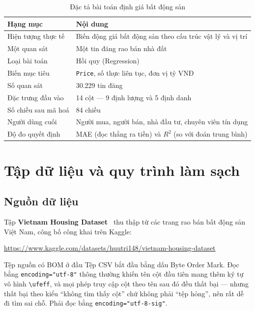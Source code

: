 \begin{table}[H]
\centering
\caption{Đặc tả bài toán định giá bất động sản}
\label{tab:dacta-hou}
\small
\begin{tabularx}{\textwidth}{@{}L{4.2cm}X@{}}
\toprule
\textbf{Hạng mục} & \textbf{Nội dung} \\
\midrule
Hiện tượng thực tế   & Biến động giá bất động sản theo cấu trúc vật lý và vị trí \\
Một quan sát         & Một tin đăng rao bán nhà đất \\
Loại bài toán        & Hồi quy (Regression) \\
Biến mục tiêu        & \texttt{Price}, số thực liên tục, đơn vị tỷ VNĐ \\
Số quan sát          & 30.229 tin đăng \\
Đặc trưng đầu vào    & 14 cột --- 9 định lượng và 5 định danh \\
Số chiều sau mã hoá  & 84 chiều \\
Người dùng cuối      & Người mua, người bán, nhà đầu tư, chuyên viên tín dụng \\
Độ đo quyết định     & MAE (đọc thẳng ra tiền) và $R^2$ (so với đoán trung bình) \\
\bottomrule
\end{tabularx}
\end{table}

\section{Tập dữ liệu và quy trình làm sạch}
\label{sec:dulieu-hou}

\subsection{Nguồn dữ liệu}

Tập \textbf{Vietnam Housing Dataset}~\cite{vnhousing} thu thập từ các trang rao bán bất động sản
Việt Nam, công bố công khai trên Kaggle:

\begin{center}
\small\url{https://www.kaggle.com/datasets/huutri148/vietnam-housing-dataset}
\end{center}

\begin{phathien}{Tệp nguồn có BOM ở đầu}
Tệp CSV bắt đầu bằng dấu Byte Order Mark. Đọc bằng \texttt{encoding="utf-8"}
thông thường khiến tên cột đầu tiên mang thêm ký tự vô hình \texttt{\textbackslash ufeff},
và mọi phép truy cập cột theo tên sau đó đều thất bại --- nhưng thất bại theo
kiểu ``không tìm thấy cột'' chứ không phải ``tệp hỏng'', nên rất dễ đi tìm sai
chỗ. Phải đọc bằng \texttt{encoding="utf-8-sig"}.
\end{phathien}


